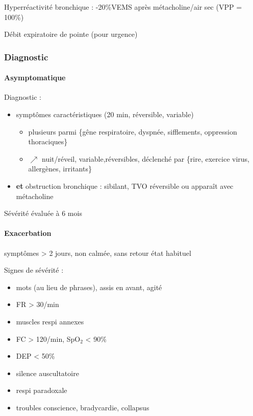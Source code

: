 \documentclass[11pt]{article}
\begin{document}
Hyperréactivité bronchique : -20\%VEMS après métacholine/air sec (VPP = 100\%)

Débit expiratoire de pointe (pour urgence)

\subsubsection{Diagnostic}
\label{sec:org1e9587c}
\paragraph{Asymptomatique}
\label{sec:org9f86903}
Diagnostic :

\begin{itemize}
\item symptômes caractéristiques (20 min, réversible, variable)

\begin{itemize}
\item plusieurs parmi \{gêne respiratoire, dyspnée,
sifflements, oppression thoraciques\}
\item \(\nearrow\) nuit/réveil, variable,réversibles, déclenché par \{rire, exercice
virus, allergènes, irritants\}
\end{itemize}

\item \textbf{et} obstruction bronchique : sibilant, TVO réversible ou apparaît avec métacholine
\end{itemize}

Sévérité évaluée à 6 mois
\paragraph{Exacerbation}
\label{sec:org2d34cd3}
\nearrow{} symptômes > 2 jours, non calmée, sans retour état habituel

Signes de sévérité :

\begin{itemize}
\item mots (au lieu de phrases), assis en avant, agité
\item FR > 30/min
\item muscles respi annexes
\item FC > 120/min, SpO\(_{\text{2}}\) < 90\%
\item DEP < 50\%
\item silence auscultatoire
\item respi paradoxale
\item troubles conscience, bradycardie, collapsus
\end{itemize}
\end{document}
